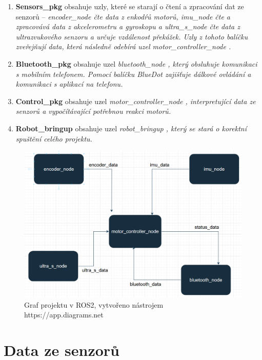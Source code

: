 \begin{enumerate}
  \item{\textbf{Sensors\_pkg} obsahuje uzly, které se starají o čtení a zpracování dat ze senzorů -- \it encoder\_node \rm čte data z enkodŕů motorů, \it imu\_node \rm čte a zpracovává data z akcelerometru a gyroskopu a \it ultra\_s\_node \rm čte data z ultrazvukového senzoru a určuje vzdálenost překážek. Uzly z tohoto balíčku zveřejňují data, která následně odebírá uzel \it motor\_controller\_node \rm. }
  \item{\textbf{Bluetooth\_pkg} obsahuje uzel \it bluetooth\_node \rm, který obsluhuje komunikaci s mobilním telefonem. Pomocí balíčku BlueDot zajišťuje dálkové ovládání a komunikaci s aplikací na telefonu.}
  \item{\textbf{Control\_pkg} obsahuje uzel \it motor\_controller\_node \rm, interpretující data ze senzorů a vypočítávající potřebnou reakci motorů.}
  \item{\textbf{Robot\_bringup} obsahuje uzel \it robot\_bringup \rm, který se stará o korektní spuštění celého projektu.}
\end{enumerate}

\begin{figure}[H]
    \centering
    \includegraphics[width=1\linewidth]{obrazky-figures/ros_graph.png}
    \caption {Graf projektu v ROS2, vytvořeno nástrojem https://app.diagrams.net}
    \label{motor}
\end{figure}

\section{Data ze senzorů}

